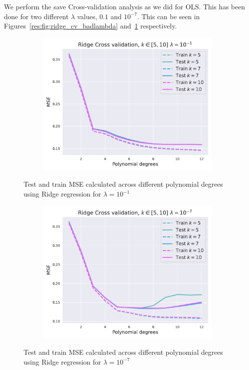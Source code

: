 \documentclass[twocolumn,english,notitlepage]{article}
\begin{document}
        We perform the save Cross-validation analysis as we did for OLS. This has been done for two different $\lambda$ values, $0.1$ and $10^{-7}$. This can be seen in Figures~\ref{res:fig:ridge_cv_badlambda} and~\ref{res:fig:ridge_cv_goodlambda} respectively.
        \begin{figure}[ht]
            \begin{subfigure}{\linewidth}
                \centering
                \includegraphics[width=\linewidth]{bad_lmbda_Ridge_mse_kfold.pdf}
            \end{subfigure}
            \caption{Test and train MSE calculated across different polynomial degrees using Ridge regression for $\lambda = 10^{-1}$}
            \label{res:fig:ridge_cv_badlambda}
            \begin{subfigure}{\linewidth}
                \centering
                \includegraphics[width=\linewidth]{good_lmbda_Ridge_mse_kfold.pdf}
            \end{subfigure}
            \caption{Test and train MSE calculated across different polynomial degrees using Ridge regression for $\lambda = 10^{-7}$}
            \label{res:fig:ridge_cv_goodlambda}
        \end{figure}
\end{document}
